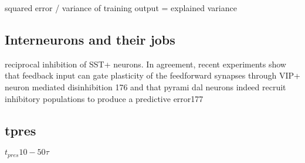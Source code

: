 squared error / variance of training output = explained variance

\subsection{Interneurons and their jobs}




reciprocal inhibition of SST+ neurons. In agreement,
recent experiments show that feedback input can gate
plasticity of the feedforward synapses through VIP+
neuron mediated disinhibition 176 and that pyrami
dal neurons indeed recruit inhibitory populations to
produce a predictive error177 \citep{Poirazi2020}

\subsection{tpres}

$t_{pres} 10 - 50 \tau$
